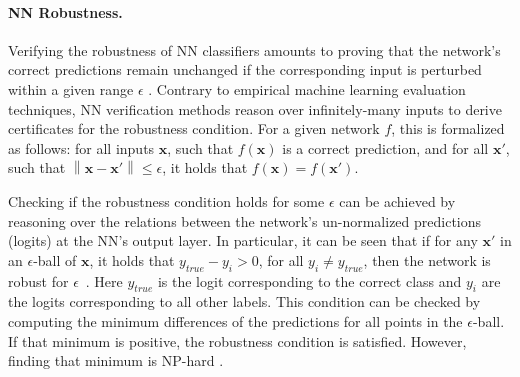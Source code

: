 

\paragraph{NN Robustness.}
Verifying the robustness of NN classifiers amounts to proving that the network's correct predictions remain unchanged if the corresponding input is perturbed within a given range $\epsilon$ \cite{Wong+18}. Contrary to empirical machine learning evaluation techniques, NN verification methods reason over infinitely-many inputs to derive certificates for the robustness condition. For a given network $f$, this is formalized as follows: for all inputs $\boldsymbol{x}$, such that $f(\boldsymbol{x})$ is a correct prediction, and for all $\boldsymbol{x}'$, such that $\left\| \boldsymbol{x} - \boldsymbol{x}' \right\| \leq \epsilon$, it holds that $f(\boldsymbol{x}) = f(\boldsymbol{x}')$. 
    
Checking if the robustness condition holds for some $\epsilon$ can be achieved by reasoning over the relations between the network's un-normalized predictions (logits) at the NN's output layer. In particular, it can be seen that if for any $\boldsymbol{x}'$ in an $\epsilon$-ball of $\boldsymbol{x}$, it holds that $\mathit{y_{true} - y_{i}} > 0$, for all $y_i \neq y_{true}$, then the network is robust for $\epsilon$~\cite{gowal2018ibp}. Here $\mathit{y_{true}}$ is the logit corresponding to the correct class and $y_i$ are the logits corresponding to all other labels. This condition can be checked by computing the minimum differences of the predictions for all points in the $\epsilon$-ball. If that minimum is positive, the robustness condition is satisfied. However, finding that minimum is NP-hard \cite{katz2017reluplex}. 


